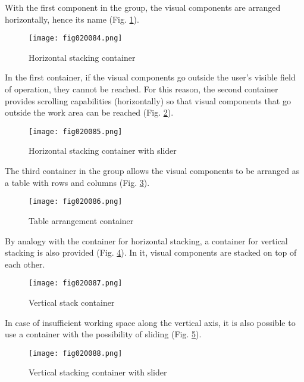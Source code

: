 With the first component in the group, the visual components are arranged horizontally, hence its name (Fig. \ref{fig020084}).

\begin{figure}[H]
   \centering
   \texttt{[image: fig020084.png]}
   \caption{Horizontal stacking container}
\label{fig020084}
\end{figure}

In the first container, if the visual components go outside the user's visible field of operation, they cannot be reached. For this reason, the second container provides scrolling capabilities (horizontally) so that visual components that go outside the work area can be reached (Fig. \ref{fig020085}).

\begin{figure}[H]
   \centering
   \texttt{[image: fig020085.png]}
   \caption{Horizontal stacking container with slider}
\label{fig020085}
\end{figure}

The third container in the group allows the visual components to be arranged as a table with rows and columns (Fig. \ref{fig020086}).

\begin{figure}[H]
   \centering
   \texttt{[image: fig020086.png]}
   \caption{Table arrangement container}
\label{fig020086}
\end{figure}

By analogy with the container for horizontal stacking, a container for vertical stacking is also provided (Fig. \ref{fig020087}). In it, visual components are stacked on top of each other.

\begin{figure}[H]
   \centering
   \texttt{[image: fig020087.png]}
   \caption{Vertical stack container}
\label{fig020087}
\end{figure}

In case of insufficient working space along the vertical axis, it is also possible to use a container with the possibility of sliding (Fig. \ref{fig020088}).

\begin{figure}[H]
   \centering
   \texttt{[image: fig020088.png]}
   \caption{Vertical stacking container with slider}
\label{fig020088}
\end{figure}

